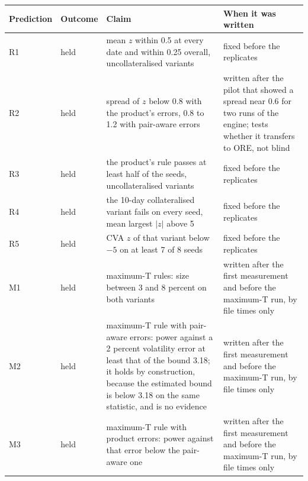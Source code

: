 \begin{table}[htbp]
\begin{tabularx}{\textwidth}{@{}l>{\raggedright\arraybackslash}p{1.5cm}>{\raggedright\arraybackslash}X>{\raggedright\arraybackslash}p{4.4cm}@{}}
\toprule
Prediction & Outcome & Claim & When it was written \\
\midrule
R1 & held & \relax mean $z$ within 0.5 at every date and within 0.25 overall, uncollateralised variants & fixed before the replicates \\
R2 & held & \relax spread of $z$ below 0.8 with the product's errors, 0.8 to 1.2 with pair-aware errors & written after the pilot that showed a spread near 0.6 for two runs of the engine; tests whether it transfers to ORE, not blind \\
R3 & held & \relax the product's rule passes at least half of the seeds, uncollateralised variants & fixed before the replicates \\
R4 & held & \relax the 10-day collateralised variant fails on every seed, mean largest $\lvert z\rvert$ above 5 & fixed before the replicates \\
R5 & held & \relax CVA $z$ of that variant below $-5$ on at least 7 of 8 seeds & fixed before the replicates \\
M1 & held & \relax maximum-T rules: size between 3 and 8 percent on both variants & written after the first measurement and before the maximum-T run, by file times only \\
M2 & held & \relax maximum-T rule with pair-aware errors: power against a 2 percent volatility error at least that of the bound 3.18; it holds by construction, because the estimated bound is below 3.18 on the same statistic, and is no evidence & written after the first measurement and before the maximum-T run, by file times only \\
M3 & held & \relax maximum-T rule with product errors: power against that error below the pair-aware one & written after the first measurement and before the maximum-T run, by file times only \\
\bottomrule
\end{tabularx}
\end{table}
